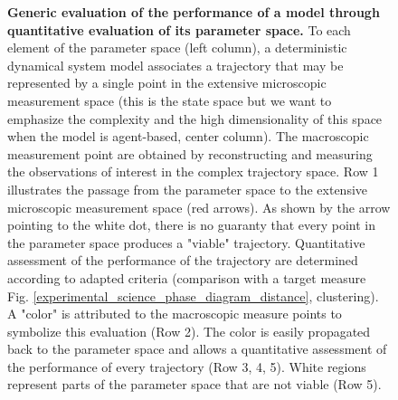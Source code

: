\begin{figure}
\caption{\textbf{ Generic evaluation of the performance of a model through quantitative evaluation of its parameter space.} To each element of the parameter space (left column), a deterministic dynamical system model associates a trajectory that may be represented by a single point in the extensive microscopic measurement space (this is the state space but we want to emphasize the complexity and the high dimensionality of this space when the model is agent-based, center column). The macroscopic measurement point are obtained by reconstructing and measuring the observations of interest in the complex trajectory space. Row 1 illustrates the passage from the parameter space to the extensive microscopic measurement space (red arrows). As shown by the arrow pointing to the white dot, there is no guaranty that every point in the parameter space produces a "viable" trajectory. Quantitative assessment of the performance of the trajectory are determined according to adapted criteria (comparison with a target measure Fig. \ref{experimental_science_phase_diagram_distance}, clustering). A "color" is attributed to the macroscopic measure points to symbolize this evaluation (Row 2). The color is easily propagated back to the parameter space and allows a quantitative assessment of the performance of every trajectory (Row 3, 4, 5). White regions represent parts of the parameter space that are not viable (Row 5).}
\label{experimental_science_phase_diagram2}
\end{figure}

